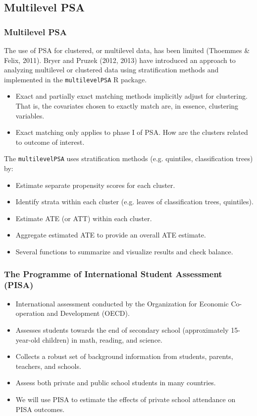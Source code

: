 \documentclass[10pt,slidestop,mathserif,c]{beamer}
\begin{document}
\subsection{Multilevel PSA}

\begin{frame}
    \frametitle{Multilevel PSA}
    The use of PSA for clustered, or multilevel data, has been limited (Thoemmes \& Felix, 2011). Bryer and Pruzek (2012, 2013) have introduced an approach to analyzing multilevel or clustered data using stratification methods and implemented in the \texttt{multilevelPSA} R package.
    \begin{itemize}
        \item Exact and partially exact matching methods implicitly adjust for clustering. That is, the covariates chosen to exactly match are, in essence, clustering variables.
        \item Exact matching only applies to phase I of PSA. How are the clusters related to outcome of interest.
    \end{itemize}  
    The \texttt{multilevelPSA} uses stratification methods (e.g. quintiles, classification trees) by:
    \begin{itemize}
        \item Estimate separate propensity scores for each cluster.
        \item Identify strata within each cluster (e.g. leaves of classification trees, quintiles).
        \item Estimate ATE (or ATT) within each cluster.
        \item Aggregate estimated ATE to provide an overall ATE estimate.
        \item Several functions to summarize and visualize results and check balance.
    \end{itemize}
\end{frame}

\begin{frame}
    \frametitle{The Programme of International Student Assessment (PISA)}
    \begin{itemize}
        \item International assessment conducted by the Organization for Economic Co-operation and Development (OECD).
        \item Assesses students towards the end of secondary school (approximately 15-year-old children) in math, reading, and science.
        \item Collects a robust set of background information from students, parents, teachers, and schools.
        \item Assess both private and public school students in many countries.
        \item We will use PISA to estimate the effects of private school attendance on PISA outcomes.
    \end{itemize}
\end{frame}
\end{document}
